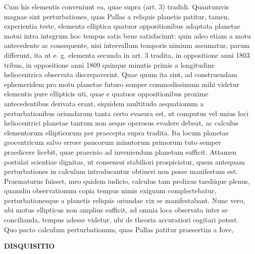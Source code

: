 Cum his elementis conveniunt ea, quae supra (art. 3) tradidi.
Quantumvis magnae sint perturbationes, quas Pallas a reliquis planetis patitur, tamen, experientia teste, elementa elliptica quatuor oppositionibus adaptata planetae motui intra integrum hoc tempus satis bene satisfaciunt: quin adeo etiam a motu antecedente ac consequente, nisi intervallum temporis nimium assumatur, parum differunt, ita ut e. g. elementa secunda in art. 3 tradita, in oppositione anni 1803 tribus, in oppositione anni 1809 quinque minutis primis a longitudine heliocentrica observata discrepaverint. Quae quum ita sint, ad construendam ephemeridem pro motu planetae futuro semper commodissimum mihi videtur elementis pure ellipticis uti, quae e quatuor oppositionibus proxime antecedentibus derivata erant, siquidem multitudo aequationum a perturbationibus oriundarum tanta certo evasura est, ut computus vel unius loci heliocentrici planetae tantum non aeque operosus evadere debeat, ac calculus elementorum ellipticorum per praecepta supra tradita. Ita locum planetae geocentricum salvo errore paucorum minutorum primorum tuto semper praedicere licebit, quae praecisio ad inveniendum planetam sufficit.
Attamen postulat scientiae dignitas, ut consensui stabiliori prospiciatur, quem antequam perturbationes in calculum introducantur obtineri non posse manifestum est. Praematurus fuisset, meo quidem iudicio, calculus tam prolixus taediique plenus, quamdiu observationum copia tempus nimis exiguum complectebatur, perturbationesque a planetis reliquis oriundae vix se manifestabant. Nunc vero, ubi motus ellipticus non amplius sufficit, ad omnia loca observata inter se concilianda, tempus adesse videtur, ubi de theoria accuratiori cogitari potest. Quo pacto calculum perturbationum, quas Pallas patitur praesertim a Iove,
\par\clearpage
\normalsize
\thispagestyle{empty}
\noindent{}%
%
\parbox[t]{\dimexpr\linewidth-24mm\relax}{\centering\footnotesize\bfseries DISQUISITIO\par}%
\makebox[12mm][r]{}\par\nobreak\medskip
